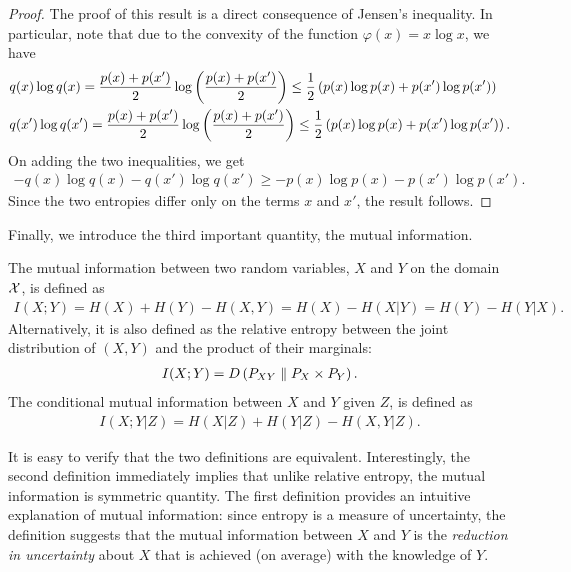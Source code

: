         \begin{proof}
            The proof of this result is a direct consequence of Jensen's inequality. In particular, note that due to the convexity of the function $\varphi(x) = x \log x$, we have 
            \begin{align}
                &q(x) \log q(x) = \frac{p(x) + p(x')}{2}\log \left( \frac{p(x) + p(x')}{2} \right)  \leq \frac{1}{2} \left( p(x) \log p(x) + p(x') \log p(x') \right) \\
                &q(x') \log q(x') = \frac{p(x) + p(x')}{2}\log \left( \frac{p(x) + p(x')}{2} \right)  \leq \frac{1}{2} \left( p(x) \log p(x) + p(x') \log p(x') \right). 
            \end{align}
            On adding the two inequalities, we get 
            \begin{align}
                -q(x) \log q(x) - q(x') \log q(x') \geq -p(x) \log p(x) - p(x') \log p(x'). 
            \end{align}
            Since the two entropies differ only on the terms $x$ and $x'$, the result follows.
        \end{proof}
        Finally, we introduce the third important quantity, the mutual information. 
        \begin{definition}
        \label{def:mutual-information}
        The mutual information between two random variables, $X$ and $Y$ on the domain $\mathcal{X}$, is defined as 
        \begin{align}
            I(X; Y) = H(X) + H(Y) - H(X, Y) = H(X) - H(X|Y) = H(Y) - H(Y|X). 
        \end{align}
        Alternatively, it is also defined as the relative entropy between the joint distribution of $(X,Y)$ and the product of their marginals: 
        \begin{align}
            I(X; Y) = D\left( P_{XY} \parallel P_X \times P_Y \right). 
        \end{align}
        The conditional mutual information between $X$ and $Y$ given $Z$, is defined as 
        \begin{align}
            I(X; Y|Z) = H(X|Z) + H(Y|Z) - H(X, Y|Z). 
        \end{align}
        \end{definition}
        It is easy to verify that the two definitions are equivalent. Interestingly, the second definition immediately implies that unlike relative entropy, the mutual information is symmetric quantity. The first definition provides an intuitive explanation of mutual information: since entropy is a measure of uncertainty, the definition suggests that the mutual information between $X$ and $Y$ is the \emph{reduction in uncertainty} about $X$ that is achieved (on average) with the knowledge of $Y$. 

